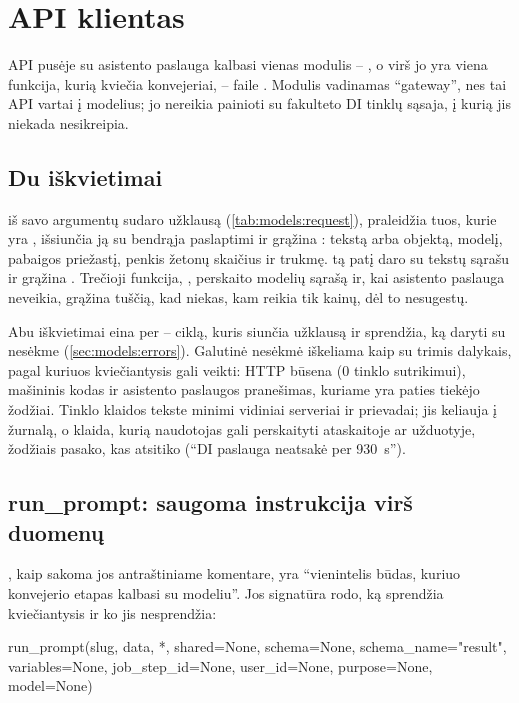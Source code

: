 \section{API klientas}\label{sec:models:client}

API pusėje su asistento paslauga kalbasi vienas modulis -- , o virš
jo yra viena funkcija, kurią kviečia konvejeriai, --  faile
. Modulis vadinamas \enquote{gateway}, nes tai API vartai į modelius;
jo nereikia painioti su fakulteto DI tinklų sąsaja, į kurią jis niekada nesikreipia.

\subsection{Du iškvietimai}

 iš savo argumentų sudaro užklausą (\cref{tab:models:request}),
praleidžia tuos, kurie yra , išsiunčia ją su bendrąja paslaptimi ir grąžina
: tekstą arba objektą, modelį, pabaigos priežastį, penkis žetonų skaičius
ir trukmę.  tą patį daro su tekstų sąrašu ir grąžina .
Trečioji funkcija, , perskaito modelių sąrašą ir, kai asistento paslauga
neveikia, grąžina tuščią, kad niekas, kam reikia tik kainų, dėl to nesugestų.

Abu iškvietimai eina per  -- ciklą, kuris siunčia užklausą ir sprendžia, ką daryti
su nesėkme (\cref{sec:models:errors}). Galutinė nesėkmė iškeliama kaip  su
trimis dalykais, pagal kuriuos kviečiantysis gali veikti: HTTP būsena (0 tinklo sutrikimui),
mašininis kodas ir asistento paslaugos pranešimas, kuriame yra paties tiekėjo žodžiai. Tinklo
klaidos tekste minimi vidiniai serveriai ir prievadai; jis keliauja į žurnalą, o klaida, kurią
naudotojas gali perskaityti ataskaitoje ar užduotyje, žodžiais pasako, kas atsitiko
(\enquote{DI paslauga neatsakė per 930~s}).

\subsection{run\_prompt: saugoma instrukcija virš duomenų}

, kaip sakoma jos antraštiniame komentare, yra \enquote{vienintelis būdas,
kuriuo konvejerio etapas kalbasi su modeliu}. Jos signatūra rodo, ką sprendžia kviečiantysis
ir ko jis nesprendžia:

\begin{codeblock}
run_prompt(slug, data, *, shared=None, schema=None, schema_name="result",
           variables=None, job_step_id=None, user_id=None, purpose=None, model=None)
\end{codeblock}

